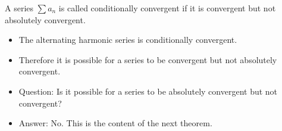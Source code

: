 \begin{frame}
\begin{definition}
A series $\displaystyle \sum a_n$ is called conditionally convergent if it is convergent but not absolutely convergent.
\end{definition}
\begin{itemize}
\item<2->  The alternating harmonic series is conditionally convergent.
\item<3->  Therefore it is possible for a series to be convergent but not absolutely convergent.
\item<4->  Question: Is it possible for a series to be absolutely convergent but not convergent?
\item<5->  Answer: No.  This is the content of the next theorem.
\end{itemize}
\end{frame}
